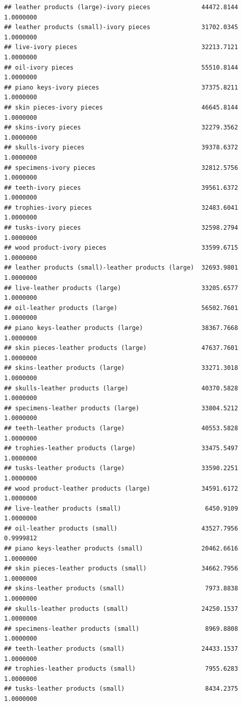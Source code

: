 \documentclass[
  12pt,
]{article}
\begin{document}
\begin{verbatim}
## leather products (large)-ivory pieces              44472.8144 1.0000000
## leather products (small)-ivory pieces              31702.0345 1.0000000
## live-ivory pieces                                  32213.7121 1.0000000
## oil-ivory pieces                                   55510.8144 1.0000000
## piano keys-ivory pieces                            37375.8211 1.0000000
## skin pieces-ivory pieces                           46645.8144 1.0000000
## skins-ivory pieces                                 32279.3562 1.0000000
## skulls-ivory pieces                                39378.6372 1.0000000
## specimens-ivory pieces                             32812.5756 1.0000000
## teeth-ivory pieces                                 39561.6372 1.0000000
## trophies-ivory pieces                              32483.6041 1.0000000
## tusks-ivory pieces                                 32598.2794 1.0000000
## wood product-ivory pieces                          33599.6715 1.0000000
## leather products (small)-leather products (large)  32693.9801 1.0000000
## live-leather products (large)                      33205.6577 1.0000000
## oil-leather products (large)                       56502.7601 1.0000000
## piano keys-leather products (large)                38367.7668 1.0000000
## skin pieces-leather products (large)               47637.7601 1.0000000
## skins-leather products (large)                     33271.3018 1.0000000
## skulls-leather products (large)                    40370.5828 1.0000000
## specimens-leather products (large)                 33804.5212 1.0000000
## teeth-leather products (large)                     40553.5828 1.0000000
## trophies-leather products (large)                  33475.5497 1.0000000
## tusks-leather products (large)                     33590.2251 1.0000000
## wood product-leather products (large)              34591.6172 1.0000000
## live-leather products (small)                       6450.9109 1.0000000
## oil-leather products (small)                       43527.7956 0.9999812
## piano keys-leather products (small)                20462.6616 1.0000000
## skin pieces-leather products (small)               34662.7956 1.0000000
## skins-leather products (small)                      7973.8838 1.0000000
## skulls-leather products (small)                    24250.1537 1.0000000
## specimens-leather products (small)                  8969.8808 1.0000000
## teeth-leather products (small)                     24433.1537 1.0000000
## trophies-leather products (small)                   7955.6283 1.0000000
## tusks-leather products (small)                      8434.2375 1.0000000

\end{verbatim}
\end{document}
